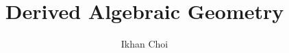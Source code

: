 \documentclass{../../large}
\begin{document}
\title{Derived Algebraic Geometry}
\author{Ikhan Choi}
\maketitle
\tableofcontents

\part{}
\chapter{}
\end{document}
